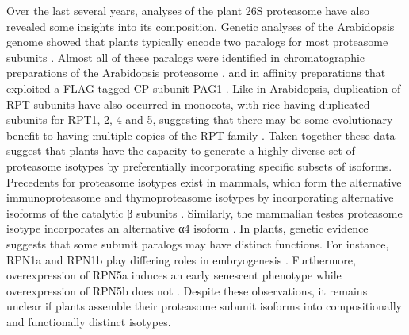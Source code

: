 	Over the last several years, analyses of the plant 26S proteasome have also revealed some insights into its composition. Genetic analyses of the Arabidopsis genome showed that plants typically encode two paralogs for most proteasome subunits \citep{fu98}.  Almost all of these paralogs were identified in chromatographic preparations of the Arabidopsis proteasome \citep{yang04}, and in affinity preparations that exploited a FLAG tagged CP subunit PAG1 \citep{book10}. Like in Arabidopsis, duplication of RPT subunits have also occurred in monocots, with rice having duplicated subunits for RPT1, 2, 4 and 5, suggesting that there may be some evolutionary benefit to having multiple copies of the RPT family \citep{shibahara04}. Taken together these data suggest that plants have the capacity to generate a highly diverse set of proteasome isotypes by preferentially incorporating specific subsets of isoforms.  Precedents for proteasome isotypes exist in mammals, which form the alternative immunoproteasome and thymoproteasome isotypes by incorporating alternative isoforms of the catalytic β subunits \citep{murata07, nandi96}. Similarly, the mammalian testes proteasome isotype incorporates an alternative α4 isoform \citep{belote98}.  In plants, genetic evidence suggests that some subunit paralogs may have distinct functions. For instance, RPN1a and RPN1b play differing roles in embryogenesis \citep{brukhin05}. Furthermore, overexpression of RPN5a induces an early senescent phenotype while overexpression of RPN5b does not \citep{book09}. Despite these observations, it remains unclear if plants assemble their proteasome subunit isoforms into compositionally and functionally distinct isotypes. 
	
